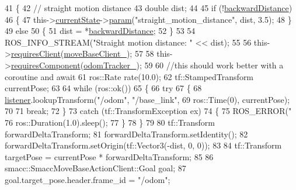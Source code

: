 \begin{DoxyCode}
41     \{
42         \textcolor{comment}{// straight motion distance}
43         \textcolor{keywordtype}{double} dist;
44 
45         \textcolor{keywordflow}{if} (!\hyperlink{classsm__dance__bot_1_1SbNavigateBackwards_a521e30a8947d54e0c16b6ed87d01a89f}{backwardDistance})
46         \{
47             this->\hyperlink{classsmacc_1_1SmaccSubStateBehavior_a62e2b9da4a446f09396d0b4c01659b88}{currentState}->\hyperlink{classsmacc_1_1ISmaccState_a4982f2187ed6da337462721146e8ef70}{param}(\textcolor{stringliteral}{"straight\_motion\_distance"}, dist, 3.5);
48         \}
49         \textcolor{keywordflow}{else}
50         \{
51             dist = *\hyperlink{classsm__dance__bot_1_1SbNavigateBackwards_a521e30a8947d54e0c16b6ed87d01a89f}{backwardDistance};
52         \}
53 
54         ROS\_INFO\_STREAM(\textcolor{stringliteral}{"Straight motion distance: "} << dist);
55 
56         this->\hyperlink{classsmacc_1_1SmaccSubStateBehavior_ae8361a9e794b02f9f3d962b881e4fd7d}{requiresClient}(\hyperlink{classsm__dance__bot_1_1SbNavigateBackwards_a363a6734c204d86d6e03b34f1bcfd9e1}{moveBaseClient\_});
57 
58         this->\hyperlink{classsmacc_1_1SmaccSubStateBehavior_a9f31f62f886cc06017e92fa0d834b12d}{requiresComponent}(\hyperlink{classsm__dance__bot_1_1SbNavigateBackwards_a5e5d9dc660a33cfdfc48ade609bc69e9}{odomTracker\_});
59 
60         \textcolor{comment}{//this should work better with a coroutine and await}
61         ros::Rate rate(10.0);
62         tf::StampedTransform currentPose;
63 
64         \textcolor{keywordflow}{while} (ros::ok())
65         \{
66             \textcolor{keywordflow}{try}
67             \{
68                 \hyperlink{classsm__dance__bot_1_1SbNavigateBackwards_aa7ad50d23859f1e19da82d82c9d3ece1}{listener}.lookupTransform(\textcolor{stringliteral}{"/odom"}, \textcolor{stringliteral}{"/base\_link"},
69                                          ros::Time(0), currentPose);
70 
71                 \textcolor{keywordflow}{break};
72             \}
73             \textcolor{keywordflow}{catch} (tf::TransformException ex)
74             \{
75                 ROS\_ERROR(\textcolor{stringliteral}{"%
76                 ros::Duration(1.0).sleep();
77             \}
78         \}
79 
80         tf::Transform forwardDeltaTransform;
81         forwardDeltaTransform.setIdentity();
82         forwardDeltaTransform.setOrigin(tf::Vector3(-dist, 0, 0));
83 
84         tf::Transform targetPose = currentPose * forwardDeltaTransform;
85 
86         smacc::SmaccMoveBaseActionClient::Goal goal;
87         goal.target\_pose.header.frame\_id = \textcolor{stringliteral}{"/odom"};
}
\end{DoxyCode}
